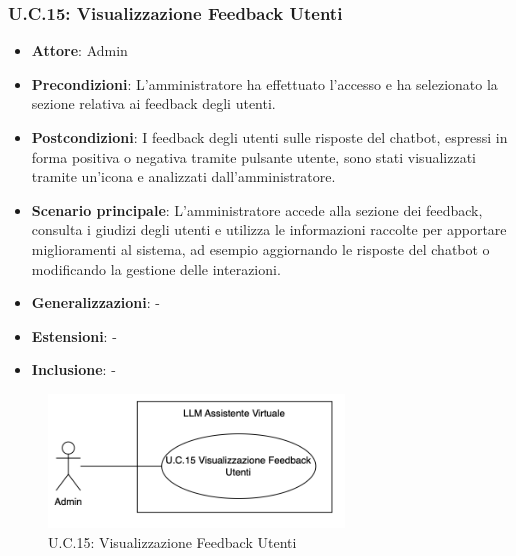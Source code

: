 \subsubsection{U.C.15: Visualizzazione Feedback Utenti}
\begin{itemize}
    \item \textbf{Attore}: Admin
    \item \textbf{Precondizioni}: L'amministratore ha effettuato l'accesso e ha selezionato la sezione relativa ai feedback degli utenti.
    \item \textbf{Postcondizioni}: I feedback degli utenti sulle risposte del chatbot, espressi in forma positiva o negativa tramite pulsante utente, sono stati visualizzati tramite un'icona e analizzati dall’amministratore.  
    \item \textbf{Scenario principale}: L'amministratore accede alla sezione dei feedback, consulta i giudizi degli utenti e utilizza le informazioni raccolte per apportare miglioramenti al sistema, ad esempio aggiornando le risposte del chatbot o modificando la gestione delle interazioni.
    \item \textbf{Generalizzazioni}: -
    \item \textbf{Estensioni}: -
    \item \textbf{Inclusione}: -
\end{itemize}
\begin{figure}[H]
    \centering
    \includegraphics[width=0.7\textwidth]{img/UC15.png}
    \caption{U.C.15: Visualizzazione Feedback Utenti}
\end{figure}
\newpage

